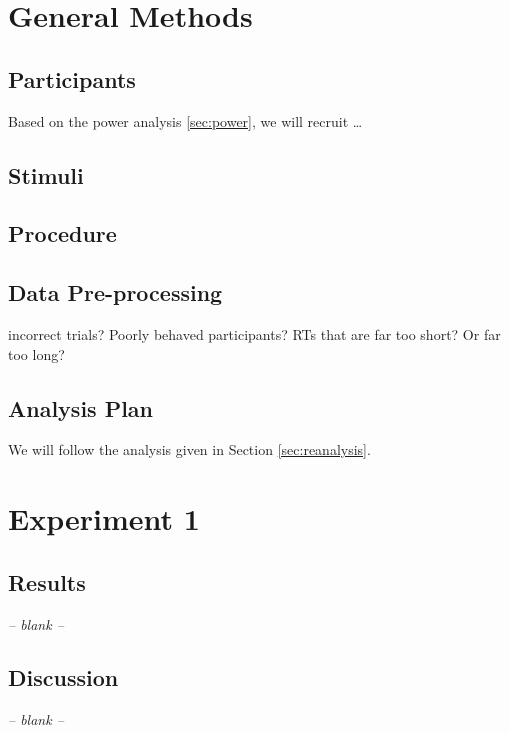 \documentclass[smallextended]{svjour3}       %
\begin{document}
\section{General Methods}

\subsection{Participants}

Based on the power analysis \ref{sec:power}, we will recruit \ldots

\subsection{Stimuli}

\subsection{Procedure}

\subsection{Data Pre-processing}

incorrect trials? Poorly behaved participants? RTs that are far too short? Or far too long?

\subsection{Analysis Plan}

We will follow the analysis given in Section \ref{sec:reanalysis}.


\section{Experiment 1}



\subsection{Results}
\begin{center}
\textit{-- blank --}
\end{center}

\subsection{Discussion}
\begin{center}
\textit{-- blank --}
\end{center}
\end{document}

